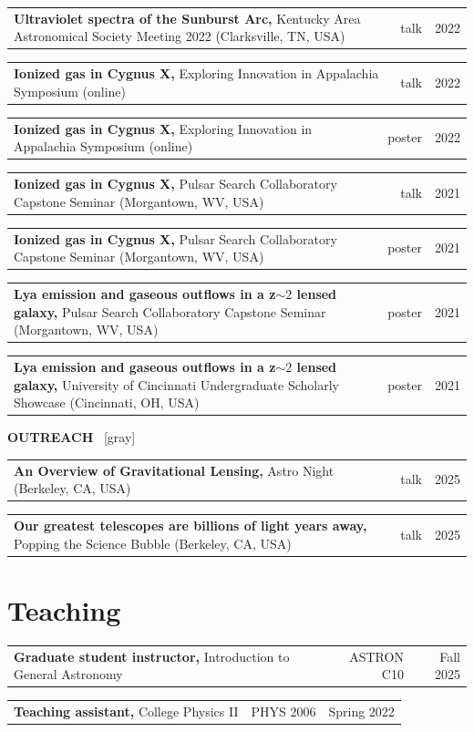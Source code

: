 \documentclass[11pt]{article}
\makeatletter
\newcommand{\presentation}[4]{
    {
    \noindent
    \begin{tabularx}{\textwidth}{@{} X rr @{}}
        \textbf{#1,} {\color{gray}\fontseries{normal}\selectfont #2}
        & #3 & #4 \\
    \end{tabularx}
    \addvspace{0.1cm}
    }
}
\newcommand{\teaching}[5]{
    {
    \noindent
    \begin{tabularx}{\textwidth}{@{} X rr @{}}
        \textbf{#1,} {\color{gray}\fontseries{normal}\selectfont #2}\newline {\color{gray}\fontseries{bold}\selectfont #5} & #3 & #4 \\
    \end{tabularx}
    \addvspace{0.1cm}
    }
}
\makeatother
\begin{document}
\presentation{Ultraviolet spectra of the Sunburst Arc}{Kentucky Area Astronomical Society Meeting 2022 (Clarksville, TN, USA)}{talk}{2022}

\presentation{Ionized gas in Cygnus X}{Exploring Innovation in Appalachia Symposium (online)}{talk}{2022}

\presentation{Ionized gas in Cygnus X}{Exploring Innovation in Appalachia Symposium (online)}{poster}{2022}

\presentation{Ionized gas in Cygnus X}{2021 Pulsar Search Collaboratory Capstone Seminar (Morgantown, WV, USA)}{talk}{2021}

\presentation{Ionized gas in Cygnus X}{2021 Pulsar Search Collaboratory Capstone Seminar (Morgantown, WV, USA)}{poster}{2021}

\presentation{Lya emission and gaseous outflows in a z$\sim2$ lensed galaxy}{2021 Pulsar Search Collaboratory Capstone Seminar (Morgantown, WV, USA)}{poster}{2021}

\presentation{Lya emission and gaseous outflows in a z$\sim2$ lensed galaxy}{University of Cincinnati Undergraduate Scholarly Showcase (Cincinnati, OH, USA)}{poster}{2021}

\addvspace{0.3cm}
\noindent\textbf{OUTREACH} ~\xdotfill{1pt}[gray]
\addvspace{0.3cm}

\presentation{An Overview of Gravitational Lensing}{Astro Night (Berkeley, CA, USA)}{talk}{2025}

\presentation{Our greatest telescopes are billions of light years away}{Popping the Science Bubble (Berkeley, CA, USA)}{talk}{2025}



\section{Teaching}

\teaching{Graduate student instructor}{Introduction to General Astronomy}{ASTRON C10}{Fall 2025}{University of California, Berkeley}

\teaching{Teaching assistant}{College Physics II}{PHYS 2006}{Spring 2022}{University of Cincinnati}
\end{document}
